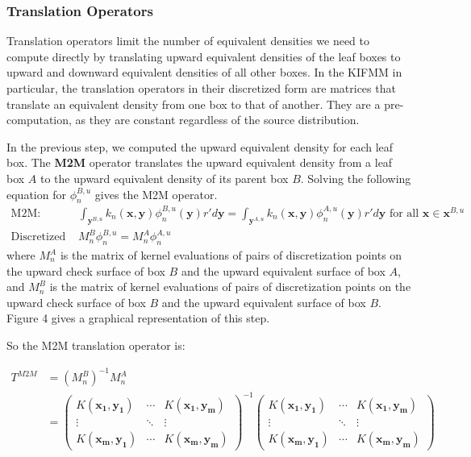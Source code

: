 \documentclass[11pt, oneside]{article}   	%
\begin{document}
\subsubsection{Translation Operators}

Translation operators limit the number of equivalent densities we need to compute directly by translating upward equivalent densities of the leaf boxes to upward and downward equivalent densities of all other boxes. In the KIFMM in particular, the translation operators in their discretized form are matrices that translate an equivalent density from one box to that of another. They are a pre-computation, as they are constant regardless of the source distribution.

In the previous step, we computed the upward equivalent density for each leaf box. The \textbf{M2M} operator translates the upward equivalent density from a leaf box $A$ to the upward equivalent density of its parent box $B$. Solving the following equation for $\phi_n^{B,u}$ gives the M2M operator.
\begin{align}
\mbox{M2M: }&\int_{\mathbf{y}^{B,u}}{k_n(\mathbf{x},\mathbf{y})}\phi^{B,u}_n{(\mathbf{y})}r'd\mathbf{y} = \int_{\mathbf{y}^{A,u}}{k_n(\mathbf{x},\mathbf{y})}\phi^{A,u}_n{(\mathbf{y})}r'd\mathbf{y}\mbox{ for all }\mathbf{x}\in\mathbf{x}^{B,u}\\
\mbox{Discretized M2M: }&M_n^B\phi^{B,u}_n=M_n^A\phi^{A,u}_n
\end{align}
where $M_n^A$ is the matrix of kernel evaluations of pairs of discretization points on the upward check surface of box $B$ and the upward equivalent surface of box $A$, and $M_n^B$ is the matrix of kernel evaluations of pairs of discretization points on the upward check surface of box $B$ and the upward equivalent surface of box $B$. Figure 4 gives a graphical representation of this step.

So the M2M translation operator is:

\begin{align}
T^{M2M} &= (M_n^B)^{-1}M_n^A\\
&= \begin{pmatrix}
  K(\mathbf{x_1},\mathbf{y_1}) & \cdots & K(\mathbf{x_1},\mathbf{y_m})  \\
  \vdots  & \ddots & \vdots  \\
  K(\mathbf{x_m},\mathbf{y_1}) & \cdots & K(\mathbf{x_m},\mathbf{y_m}) 
 \end{pmatrix}^{-1}\begin{pmatrix}
  K(\mathbf{x_1},\mathbf{y_1}) & \cdots & K(\mathbf{x_1},\mathbf{y_m})  \\
  \vdots  & \ddots & \vdots  \\
  K(\mathbf{x_m},\mathbf{y_1}) & \cdots & K(\mathbf{x_m},\mathbf{y_m}) 
 \end{pmatrix}
\end{align}
\end{document}
